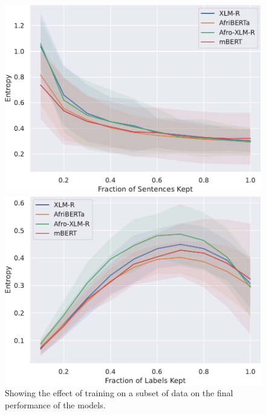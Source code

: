 \documentclass{article}
\begin{document}
\begin{figure}
    \centering
    \begin{minipage}[t]{0.33\linewidth}
        \captionsetup{width=.8\linewidth}
        \includegraphics[width=1\linewidth]{images/ALL_global_cap_sentences.pdf}
        \caption{Showing the effect of training on a subset of data on the final performance of the models.}
        \label{fig:entropy:global_cap_sentences}
    \end{minipage}
    \begin{minipage}[t]{0.33\linewidth}
    \captionsetup{width=.8\linewidth}
        \centering
        \includegraphics[width=1\linewidth]{images/ALL_global_cap_labels.pdf}

\end{minipage}
\end{figure}
\end{document}
